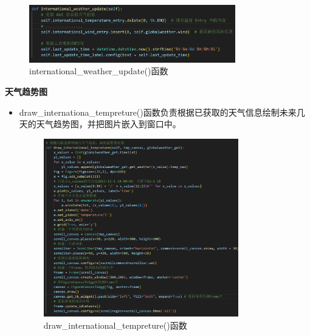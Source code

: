 \documentclass[UTF8]{ctexart}
\begin{document}
\begin{enumerate}
\begin{itemize}
      \begin{figure}[H]
         \centering
         \includegraphics[width=0.8\textwidth]{picd.png}
         \caption{international\_weather\_update()函数}
      \end{figure}
   \end{itemize}
   \textbf{天气趋势图}
   \begin{itemize}
      \item draw\_internationa\_tempreture()函数负责根据已获取的天气信息绘制未来几天的天气趋势图，并把图片嵌入到窗口中。
      \begin{figure}[H]
         \centering
         \includegraphics[width=0.8\textwidth]{pice.png}
         \caption{draw\_international\_tempreture()函数}
      \end{figure}
   \end{itemize}
   

\end{enumerate}
\end{document}
